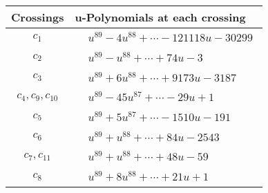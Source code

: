 \documentclass[1p]{elsarticle_modified}
\theoremstyle{definition}
\begin{document}
\begin{tabular}{m{50pt}|m{274pt}}
Crossings & \hspace{64pt}u-Polynomials at each crossing \\
\hline $$\begin{aligned}c_{1}\end{aligned}$$&$\begin{aligned}
&u^{89}-4 u^{88}+\cdots-121118 u-30299
\end{aligned}$\\
\hline $$\begin{aligned}c_{2}\end{aligned}$$&$\begin{aligned}
&u^{89}- u^{88}+\cdots+74 u-3
\end{aligned}$\\
\hline $$\begin{aligned}c_{3}\end{aligned}$$&$\begin{aligned}
&u^{89}+6 u^{88}+\cdots+9173 u-3187
\end{aligned}$\\
\hline $$\begin{aligned}c_{4},c_{9},c_{10}\end{aligned}$$&$\begin{aligned}
&u^{89}-45 u^{87}+\cdots-29 u+1
\end{aligned}$\\
\hline $$\begin{aligned}c_{5}\end{aligned}$$&$\begin{aligned}
&u^{89}+5 u^{87}+\cdots-1510 u-191
\end{aligned}$\\
\hline $$\begin{aligned}c_{6}\end{aligned}$$&$\begin{aligned}
&u^{89}+u^{88}+\cdots+84 u-2543
\end{aligned}$\\
\hline $$\begin{aligned}c_{7},c_{11}\end{aligned}$$&$\begin{aligned}
&u^{89}+u^{88}+\cdots+48 u-59
\end{aligned}$\\
\hline $$\begin{aligned}c_{8}\end{aligned}$$&$\begin{aligned}
&u^{89}+8 u^{88}+\cdots+21 u+1
\end{aligned}$\\
\hline
\end{tabular}\\~\\
\end{document}
